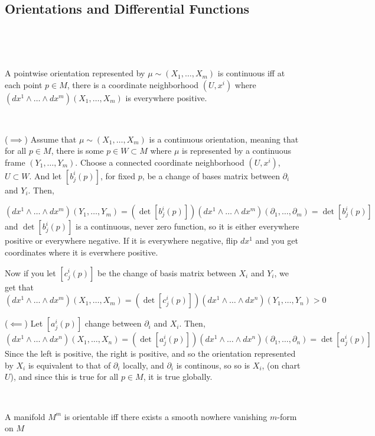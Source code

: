 \documentclass{article}
\begin{document}
\subsection{Orientations and Differential Functions}
\

\begin{lemma}
  \

  A pointwise orientation represented by $\mu \sim (X_1, \dots, X_m)$ is continuous iff at each point $p \in M$, there is a coordinate neighborhood $(U, x^i)$ where $(dx^1 \wedge \dots \wedge dx^m)(X_1, \dots, X_m)$ is everywhere positive.
\end{lemma}

\begin{customproof}
  \

  ($\implies$) Assume that $\mu \sim (X_1, \dots, X_m)$ is a continuous orientation, meaning that for all $p \in M$, there is some $p \in W \subset M$ where $\mu$ is represented by a continuous frame $(Y_1, \dots, Y_m)$. Choose a connected coordinate neighborhood $(U, x^i)$, $U \subset W$. And let $[b^i_j(p)]$, for fixed $p$, be a change of bases matrix between $\partial_i$ and $Y_i$. Then,

  $$(dx^1 \wedge \dots \wedge dx^m)(Y_1,\dots,Y_m) = (\det[b^i_j(p)])(dx^1 \wedge \dots \wedge dx^m)(\partial_1, \dots, \partial_m) = \det[b^i_j(p)]$$and $\det[b^i_j(p)]$ is a continuous, never zero function, so it is either everywhere positive or everywhere negative. If it is everywhere negative, flip $dx^1$ and you get coordinates where it is everwhere positive.

  Now if you let $[c^i_j(p)]$ be the change of basis matrix between $X_i$ and $Y_i$, we get that $$(dx^1 \wedge \dots \wedge dx^m)(X_1, \dots, X_m) = (\det[c^i_j(p)])(dx^1 \wedge \dots \wedge dx^n)(Y_1, \dots, Y_n) > 0$$

  ($\impliedby$) Let $[a^i_j(p)]$ change between $\partial_i$ and $X_i$. Then, $$(dx^1 \wedge \dots\wedge dx^n)(X_1, \dots, X_n) = (\det[a^i_j(p)])(dx^1 \wedge \dots \wedge dx^n)(\partial_1, \dots, \partial_n) = \det[a^i_j(p)]$$Since the left is positive, the right is positive, and so the orientation represented by $X_i$ is equivalent to that of $\partial_i$ locally, and $\partial_i$ is continous, so so is $X_i$, (on chart $U$), and since this is true for all $p \in M$, it is true globally.
\end{customproof}

\begin{theorem}
  \

  A manifold $M^m$ is orientable iff there exists a smooth nowhere vanishing $m$-form on $M$
\end{theorem}
\end{document}
